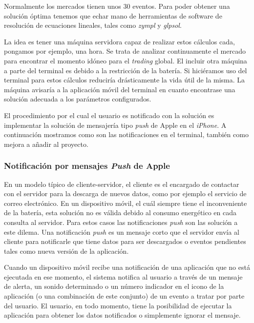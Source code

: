  Normalmente los mercados tienen unos 30 eventos. Para poder obtener una solución óptima tenemos que echar mano de herramientas de software de resolución de ecuaciones lineales, tales como \emph{zympl} y \emph{glpsol}. 
  
  
  
   La idea es tener una máquina servidora capaz de realizar estos cálculos cada, pongamos por ejemplo, una hora. Se trata de analizar continuamente el mercado para encontrar el momento idóneo para el \emph{trading} global. El incluir otra máquina a parte del terminal es debido a la restricción de la batería. Si hiciéramos uso del terminal para estos cálculos reduciría drásticamente la vida útil de la misma. La máquina avisaría a la aplicación móvil del terminal en cuanto encontrase una solución adecuada a los parámetros configurados. 
   
    El procedimiento por el cual el usuario es notificado con la solución es implementar la solución de mensajería tipo \emph{push} de Apple en el \emph{iPhone}. A continuación mostramos como son las notificaciones en el terminal, también como mejora a añadir al proyecto.
    
 \subsubsection*{Notificación por mensajes \emph{Push} de Apple}
   
   En un modelo típico de cliente-servidor, el cliente es el encargado de contactar con el servidor para la descarga de nuevos datos, como por ejemplo el servicio de correo electrónico. En un dispositivo móvil, el cuál siempre tiene el inconveniente de la batería, esta solución no es válida debido al consumo energético en cada consulta al servidor. Para estos casos las notificaciones \emph{push} son las solución a este dilema. Una notificación \emph{push} es un mensaje corto que el servidor envía al cliente para notificarle que tiene datos para ser descargados o eventos pendientes tales como nueva versión de la aplicación. 
   
    Cuando un dispositivo móvil recibe una notificación de una aplicación que no está ejecutada en ese momento, el sistema notifica al usuario a través de un mensaje de alerta, un sonido determinado o un número indicador en el icono de la aplicación (o una combinación de este conjunto) de un evento a tratar por parte del usuario. El usuario, en todo momento, tiene la posibilidad de ejecutar la aplicación para obtener los datos notificados o simplemente ignorar el mensaje.

